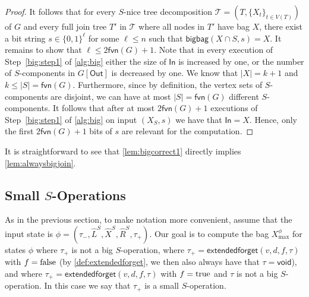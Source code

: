 \documentclass[a4paper,UKenglish,cleveref, autoref, thm-restate, numberwithinsect]{lipics-v2021}
\newcommand{\fvn}{\mathsf{fvn}}
\newcommand{\extendedforget}{\mathsf{extendedforget}}
\newcommand{\void}{\mathsf{void}}
\newcommand{\bigbag}{\mathsf{bigbag}}
\newcommand{\true}{\textup{true}}
\newcommand{\false}{\textup{false}}
\newcommand{\slim}{\text{slim}\xspace}
\newcommand{\In}{\mathsf{In}}
\newcommand{\Out}{\mathsf{Out}}
\begin{document}
\begin{proof}
It follows that for every \slim $S$-nice tree decomposition $\mathcal{T}=(T,\{X_t\}_{t\in V(T)})$ of $G$ and every full join tree $T'$ in $\mathcal{T}$ where all nodes in $T'$ have bag $X$, there exist a bit string $s\in \{0,1\}^{\ell}$ for some $\ell \le n$ such that $\bigbag(X\cap S,s)=X$. It remains to show that $\ell\le 2\fvn(G)+1$. Note that in every execution of Step~\ref{big:step1} of \cref{alg:big} either the size of $\In$ is increased by one, or the number of $S$-components in $G[\Out]$ is decreased by one. We know that $|X|=k+1$ and $k\le|S|=\fvn(G)$. Furthermore, since by definition, the vertex sets of $S$-components are disjoint, we can have at most $|S|=\fvn(G)$ different $S$-components. It follows that after at most $2\fvn(G)+1$ executions of Step~\ref{big:step1} of \cref{alg:big} on input $(X_S,s)$ we have that $\In=X$. Hence, only the first $2\fvn(G)+1$ bits of $s$ are relevant for the computation. 
\end{proof}

It is straightforward to see that \cref{lem:bigcorrect1} directly implies \cref{lem:alwaysbigjoin}.




\subsection{Small \boldmath$S$-Operations}\label{sec:smallops}
As in the previous section, to make notation more convenient, assume that the input state is $\phi=(\tau_-,\hat{L}^S, \hat{X}^S, \hat{R}^S,\tau_+)$. 
Our goal is to compute the bag $X^\phi_{\max}$ for states $\phi$ where $\tau_+$ is not a big $S$-operation, where $\tau_+=\extendedforget(v,d,f,\tau)$ with $f=\false$ (by \cref{def:extendedforget}, we then also always have that $\tau=\void$), and where $\tau_+=\extendedforget(v,d,f,\tau)$ with $f=\true$ and $\tau$ is not a big $S$-operation. 
In this case we say that $\tau_+$ is a small $S$-operation. 
\end{document}
